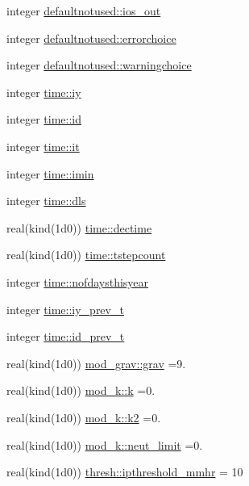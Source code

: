 \begin{DoxyCompactItemize}
\item 
integer \hyperlink{namespacedefaultnotused_a94842c2506c0ba5662c919686e38efcc}{defaultnotused\+::ios\+\_\+out}
\item 
integer \hyperlink{namespacedefaultnotused_ab415a3fec9b36b33c186cb4576c31730}{defaultnotused\+::errorchoice}
\item 
integer \hyperlink{namespacedefaultnotused_afca6daa7573cc38632f70be01568f266}{defaultnotused\+::warningchoice}
\item 
integer \hyperlink{namespacetime_a7dd4adda8e1403aee1caa796036c7204}{time\+::iy}
\item 
integer \hyperlink{namespacetime_abc3475e9770d0639f41dad7382bcb6d0}{time\+::id}
\item 
integer \hyperlink{namespacetime_a88a6c141593462330d65da0397b9b71d}{time\+::it}
\item 
integer \hyperlink{namespacetime_a9be08cae4e706325fe3524f4370754cc}{time\+::imin}
\item 
integer \hyperlink{namespacetime_a0985b09f5d79535bd56787cb3c82cfd0}{time\+::dls}
\item 
real(kind(1d0)) \hyperlink{namespacetime_acf0bd1b102769fcbe36a171b4b9e2a25}{time\+::dectime}
\item 
real(kind(1d0)) \hyperlink{namespacetime_a1e5711f85b68a21c078ff31788e419a8}{time\+::tstepcount}
\item 
integer \hyperlink{namespacetime_a2fa97bd4906ad27fe47d4699afc88fe2}{time\+::nofdaysthisyear}
\item 
integer \hyperlink{namespacetime_a6c4033d0e3f01ba6ea142f00749d0e4e}{time\+::iy\+\_\+prev\+\_\+t}
\item 
integer \hyperlink{namespacetime_a12b68236a1014f7a9cee2fac8b4aa5f0}{time\+::id\+\_\+prev\+\_\+t}
\item 
real(kind(1d0)) \hyperlink{namespacemod__grav_a582b71e075d46273d35f8b2f62ae8aec}{mod\+\_\+grav\+::grav} =9.
\item 
real(kind(1d0)) \hyperlink{namespacemod__k_a75bb9b4e883eadeb3233662441943aaf}{mod\+\_\+k\+::k} =0.
\item 
real(kind(1d0)) \hyperlink{namespacemod__k_a85838ba0577d2383b8c545d028333e48}{mod\+\_\+k\+::k2} =0.
\item 
real(kind(1d0)) \hyperlink{namespacemod__k_a22d2aee55ef526b3cae06021044b7ae0}{mod\+\_\+k\+::neut\+\_\+limit} =0.
\item 
real(kind(1d0)) \hyperlink{namespacethresh_ac4cb55bd42fcf4d309abae98b5e7ae49}{thresh\+::ipthreshold\+\_\+mmhr} = 10

\end{DoxyCompactItemize}
